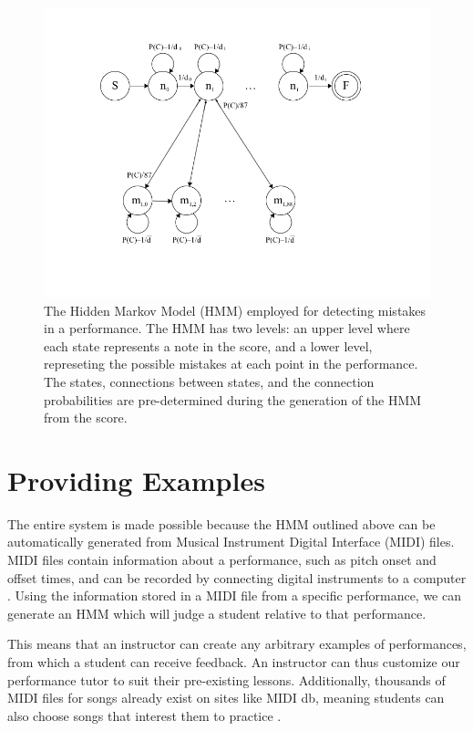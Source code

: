 \documentclass[twocolumn]{article}
\begin{document}
\begin{figure}
  \includegraphics{figures/hmm.png}
  \caption{The Hidden Markov Model (HMM) employed for detecting mistakes in a performance. The HMM has two levels: an upper level where each state represents a note in the score, and a lower level, represeting the possible mistakes at each point in the performance. The states, connections between states, and the connection probabilities are pre-determined during the generation of the HMM from the score.}\label{fig:hmm}
\end{figure}

\section{Providing Examples}

The entire system is made possible because the HMM outlined above can be automatically generated from Musical Instrument Digital Interface (MIDI) files. MIDI files contain information about a performance, such as pitch onset and offset times, and can be recorded by connecting digital instruments to a computer \cite{midi}. Using the information stored in a MIDI file from a specific performance, we can generate an HMM which will judge a student relative to that performance.

This means that an instructor can create any arbitrary examples of performances, from which a student can receive feedback. An instructor can thus customize our performance tutor to suit their pre-existing lessons. Additionally, thousands of MIDI files for songs already exist on sites like MIDI db, meaning students can also choose songs that interest them to practice \cite{mididb}.
\end{document}
